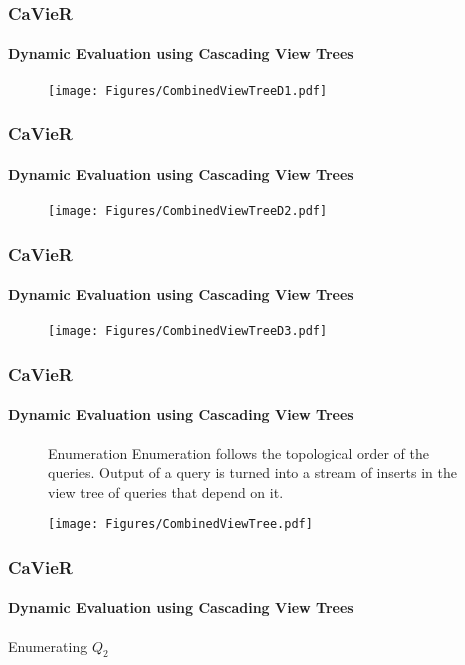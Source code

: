 \documentclass[
	11pt, %
]{beamer}
\begin{document}
\begin{frame}
	\frametitle{CaVieR}
	\framesubtitle{Dynamic Evaluation using Cascading View Trees}
	\begin{figure}
		\texttt{[image: Figures/CombinedViewTreeD1.pdf]}
	\end{figure}
\end{frame}

\begin{frame}
	\frametitle{CaVieR}
	\framesubtitle{Dynamic Evaluation using Cascading View Trees}
	\begin{figure}
		\texttt{[image: Figures/CombinedViewTreeD2.pdf]}
	\end{figure}
\end{frame}

\begin{frame}
	\frametitle{CaVieR}
	\framesubtitle{Dynamic Evaluation using Cascading View Trees}
	\begin{figure}
		\texttt{[image: Figures/CombinedViewTreeD3.pdf]}
	\end{figure}
\end{frame}

\begin{frame}
	\frametitle{CaVieR}
	\framesubtitle{Dynamic Evaluation using Cascading View Trees}
	\begin{figure}
		\begin{minipage}{0.5\textwidth}
		\begin{block}{Enumeration}
			Enumeration follows the topological order of the queries. Output of a query is turned into a stream of inserts in the view tree of queries that depend on it.
		\end{block}
		\end{minipage}
		\begin{minipage}{0.49\textwidth}
			\vspace{-0.8cm}
			\texttt{[image: Figures/CombinedViewTree.pdf]}
		\end{minipage}
	\end{figure}
\end{frame}

\begin{frame}
	\frametitle{CaVieR}
	\framesubtitle{Dynamic Evaluation using Cascading View Trees}
	Enumerating $Q_2$
	\begin{figure}
	\end{figure}
\end{frame}
\end{document}
